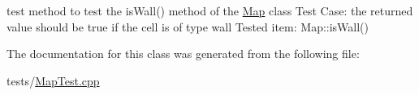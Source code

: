 test method to test the is\+Wall() method of the \hyperlink{classMap}{Map} class Test Case\+: the returned value should be true if the cell is of type wall Tested item\+: Map\+::is\+Wall() 

The documentation for this class was generated from the following file\+:\begin{DoxyCompactItemize}
\item 
tests/\hyperlink{MapTest_8cpp}{Map\+Test.\+cpp}\end{DoxyCompactItemize}
